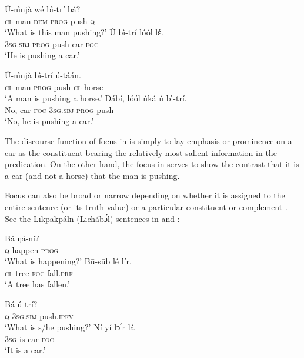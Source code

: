 \documentclass[output=paper,colorlinks,citecolor=brown]{langscibook}
\begin{document}
\ea%
    \label{ex:bisilki:4}
    \ea\label{ex:bisilki:4a}
    \gll    Ú-nìnjà	wé	bì-trí		bá?\\
            \textsc{cl-}man	\textsc{dem}	\textsc{prog-}push	\textsc{q}\\
    \glt    ‘What is this man pushing?’
    \ex\label{ex:bisilki:4b}
    \gll    Ú		bì-trí		lóól	lέ.\\
            \textsc{3sg.sbj}	\textsc{prog-}push	car	\textsc{foc}\\
    \glt    ‘He is pushing a car.’
    \z
\z

\ea%
    \label{ex:bisilki:5}
    \ea\label{ex:bisilki:5a}
    \gll    Ú-nìnjà	bì-trí		ú-táán.\\
            \textsc{cl-}man	\textsc{prog-}push	\textsc{cl-}horse\\
    \glt    ‘A man is pushing a horse.’
    \ex\label{ex:bisilki:5b}
    \gll    Dábí,	lóól	ńká	ú		bì-trí.\\
            No,	car	\textsc{foc}	\textsc{3sg.sbj}	\textsc{prog-}push\\
    \glt    ‘No, he is pushing a car.’
    \z
\z

The discourse function of focus in  is simply to lay emphasis or prominence on a car as the constituent bearing the relatively most salient information in the predication. On the other hand, the focus in  serves to show the contrast that it is a car (and not a horse) that the man is pushing.

Focus can also be broad or narrow depending on whether it is assigned to the entire sentence (or its truth value) or a particular constituent or complement \citep[44]{DikVanderHulst1981}. See the Līkpākpáln (Līchábͻ́l) sentences in  and :

\ea%
    \label{ex:bisilki:6}
    \ea\label{ex:bisilki:6a}
    \gll    Bá	ŋá-ní?\\
            \textsc{q}	happen\textsc{-prog}\\
    \glt    ‘What is happening?’
    \ex\label{ex:bisilki:6b}
    \gll    Bū-sūb	lé	lír.\\
            \textsc{cl-}tree		\textsc{foc}	fall\textsc{.prf}\\
    \glt    ‘A tree has fallen.’
    \z
\z

\ea%
    \label{ex:bisilki:7}
    \ea\label{ex:bisilki:7a}
    \gll    Bá	ú		trí?\\
            \textsc{q}	\textsc{3sg.sbj}	push\textsc{.ipfv}\\
    \glt    ‘What is s/he pushing?’
    \ex\label{ex:bisilki:7b}
    \gll    Ní	yí	lↄ՛r	lá\\
            \textsc{3sg}	is	car	\textsc{foc}\\
    \glt    ‘It is a car.’
    \z
\z
\end{document}
